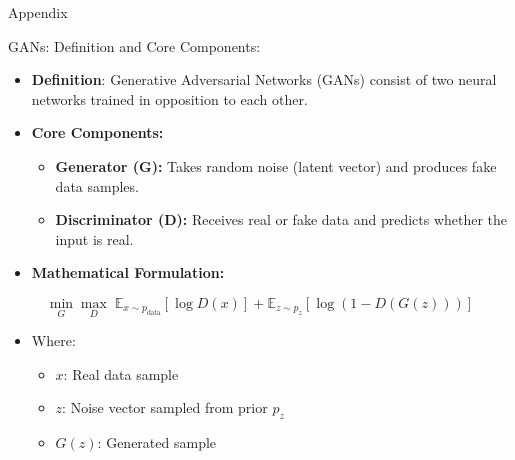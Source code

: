 \begin{frame}[allowframebreaks]{Appendix}
\begin{block}{GANs: Definition and Core Components:}
    \begin{itemize}
        \item \textbf{Definition}: Generative Adversarial Networks (GANs) consist of two neural networks trained in opposition to each other.
        \item \textbf{Core Components:}
        \begin{itemize}
            \item \textbf{Generator (G):} Takes random noise (latent vector) and produces fake data samples.
            \item \textbf{Discriminator (D):} Receives real or fake data and predicts whether the input is real.
        \end{itemize}
        \item \textbf{Mathematical Formulation:}
    \end{itemize}
    \begin{equation*}
        \min_G \max_D \; \mathbb{E}_{x \sim p_{\text{data}}} [\log D(x)] + \mathbb{E}_{z \sim p_z} [\log(1 - D(G(z)))]
    \end{equation*}
    \begin{itemize}
        \item[] Where:
        \begin{itemize}
            \item $x$: Real data sample
            \item $z$: Noise vector sampled from prior $p_z$
            \item $G(z)$: Generated sample
        \end{itemize}
    \end{itemize}
\end{block}


\end{frame}